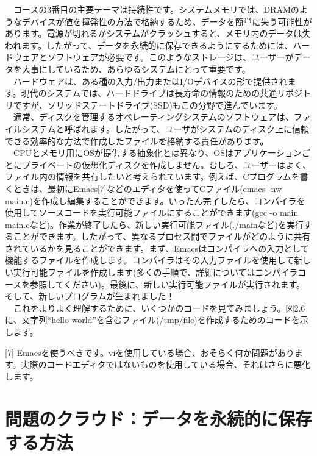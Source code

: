 　コースの3番目の主要テーマは持続性です。システムメモリでは、DRAMのようなデバイスが値を揮発性の方法で格納するため、データを簡単に失う可能性があります。電源が切れるかシステムがクラッシュすると、メモリ内のデータは失われます。したがって、データを永続的に保存できるようにするためには、ハードウェアとソフトウェアが必要です。このようなストレージは、ユーザーがデータを大事にしているため、あらゆるシステムにとって重要です。\\
　ハードウェアは、ある種の入力/出力またはI/Oデバイスの形で提供されます。現代のシステムでは、ハードドライブは長寿命の情報のための共通リポジトリですが、ソリッドステートドライブ(SSD)もこの分野で進んでいます。\\
　通常、ディスクを管理するオペレーティングシステムのソフトウェアは、ファイルシステムと呼ばれます。したがって、ユーザがシステムのディスク上に信頼できる効率的な方法で作成したファイルを格納する責任があります。\\
　CPUとメモリ用にOSが提供する抽象化とは異なり、OSはアプリケーションごとにプライベートの仮想化ディスクを作成しません。むしろ、ユーザーはよく、ファイル内の情報を共有したいと考えられています。例えば、Cプログラムを書くときは、最初にEmacs{[}7{]}などのエディタを使ってCファイル(emacs
-nw
main.c)を作成し編集することができます。いったん完了したら、コンパイラを使用してソースコードを実行可能ファイルにすることができます(gcc
-o main
main.cなど)。作業が終了したら、新しい実行可能ファイル(./mainなど)を実行することができます。したがって、異なるプロセス間でファイルがどのように共有されているかを見ることができます。まず、Emacsはコンパイラへの入力として機能するファイルを作成します。コンパイラはその入力ファイルを使用して新しい実行可能ファイルを作成します(多くの手順で、詳細についてはコンパイラコースを参照してください)。最後に、新しい実行可能ファイルが実行されます。そして、新しいプログラムが生まれました！\\
　これをよりよく理解するために、いくつかのコードを見てみましょう。図2.6に、文字列``hello
world''を含むファイル(/tmp/file)を作成するためのコードを示します。

{[}7{]}
Emacsを使うべきです。viを使用している場合、おそらく何か問題があります。実際のコードエディタではないものを使用している場合、それはさらに悪化します。

\hypertarget{ux554fux984cux306eux30afux30e9ux30a6ux30c9ux30c7ux30fcux30bfux3092ux6c38ux7d9aux7684ux306bux4fddux5b58ux3059ux308bux65b9ux6cd5}{%
\section*{問題のクラウド：データを永続的に保存する方法}\label{ux554fux984cux306eux30afux30e9ux30a6ux30c9ux30c7ux30fcux30bfux3092ux6c38ux7d9aux7684ux306bux4fddux5b58ux3059ux308bux65b9ux6cd5}}


